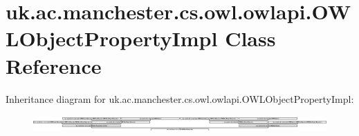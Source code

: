 \hypertarget{classuk_1_1ac_1_1manchester_1_1cs_1_1owl_1_1owlapi_1_1_o_w_l_object_property_impl}{\section{uk.\-ac.\-manchester.\-cs.\-owl.\-owlapi.\-O\-W\-L\-Object\-Property\-Impl Class Reference}
\label{classuk_1_1ac_1_1manchester_1_1cs_1_1owl_1_1owlapi_1_1_o_w_l_object_property_impl}
}
Inheritance diagram for uk.\-ac.\-manchester.\-cs.\-owl.\-owlapi.\-O\-W\-L\-Object\-Property\-Impl\-:\begin{figure}[H]
\begin{center}
\leavevmode
\includegraphics[height=0.633663cm]{classuk_1_1ac_1_1manchester_1_1cs_1_1owl_1_1owlapi_1_1_o_w_l_object_property_impl}
\end{center}
\end{figure}
